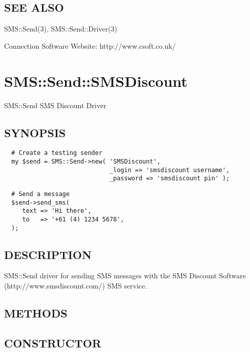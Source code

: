 \documentclass[12pt,a4paper]{article}
\begin{document}
\subsection*{SEE ALSO\label{SMS::Send::CSoft_SEE_ALSO}}


SMS::Send(3), SMS::Send::Driver(3)



Connection Software Website: http://www.csoft.co.uk/

\newpage
\section{SMS::Send::SMSDiscount\label{SMS::Send::SMSDiscount}}


SMS::Send SMS Discount Driver

\subsection*{SYNOPSIS\label{SMS::Send::SMSDiscount_SYNOPSIS}}
\begin{verbatim}
  # Create a testing sender
  my $send = SMS::Send->new( 'SMSDiscount',
                             _login => 'smsdiscount username',
                             _password => 'smsdiscount pin' );
\end{verbatim}
\begin{verbatim}
  # Send a message
  $send->send_sms(
     text => 'Hi there',
     to   => '+61 (4) 1234 5678',
  );
\end{verbatim}
\subsection*{DESCRIPTION\label{SMS::Send::SMSDiscount_DESCRIPTION}}


SMS::Send driver for sending SMS messages with the SMS Discount
Software (http://www.smsdiscount.com/) SMS service.

\subsection*{METHODS\label{SMS::Send::SMSDiscount_METHODS}}
\subsection*{CONSTRUCTOR\label{SMS::Send::SMSDiscount_CONSTRUCTOR}}
\end{document}
